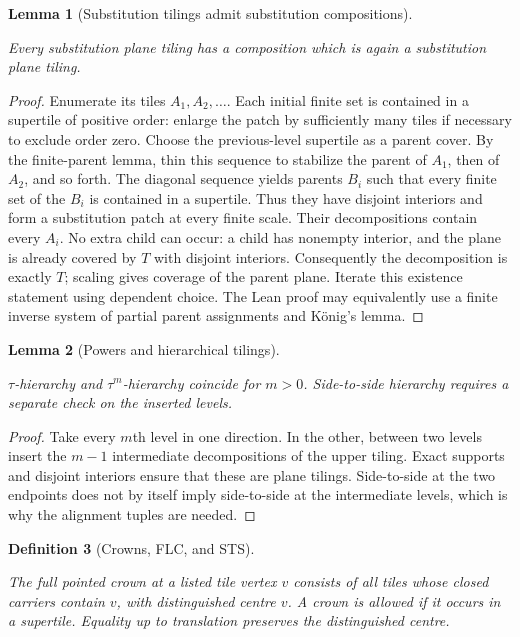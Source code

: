 \documentclass[11pt,a4paper]{article}
\newtheorem{definition}{Definition}[section]
\newtheorem{lemma}[definition]{Lemma}
\theoremstyle{remark}
\newcommand{\lean}[1]{}
\newcommand{\uses}[1]{}
\begin{document}
\begin{lemma}[Substitution tilings admit substitution compositions]
\label{lem:substitution-hierarchy}
\lean{Tilings.SubstitutionTiling.exists_composition}
\uses{def:hierarchy,lem:finiteparents,lem:localfinite}
Every substitution plane tiling has a composition which is again a
substitution plane tiling.
\end{lemma}
\begin{proof}
Enumerate its tiles $A_1,A_2,\ldots$. Each initial finite set is contained in
a supertile of positive order: enlarge the patch by sufficiently many
tiles if necessary to exclude order zero. Choose the previous-level
supertile as a parent cover. By the finite-parent lemma, thin this sequence
to stabilize the parent of $A_1$, then of $A_2$, and so forth. The diagonal
sequence yields parents $B_i$ such that every finite set of the $B_i$ is
contained in a supertile. Thus they have disjoint interiors and form a
substitution patch at every finite scale. Their decompositions contain
every $A_i$. No extra child can occur: a child has nonempty interior, and
the plane is already covered by $T$ with disjoint interiors. Consequently
the decomposition is exactly $T$; scaling gives coverage of the parent
plane. Iterate this existence statement using dependent choice.
The Lean proof may equivalently use a finite inverse system of partial
parent assignments and K\"onig's lemma.
\end{proof}

\begin{lemma}[Powers and hierarchical tilings]\label{lem:hierarchy-step}
\lean{Tilings.hierarchical_power_iff}
\uses{def:hierarchy}
$\tau$-hierarchy and $\tau^m$-hierarchy coincide for $m>0$.
Side-to-side hierarchy requires a separate check on the inserted levels.
\end{lemma}
\begin{proof}
Take every $m$th level in one direction. In the other, between two levels
insert the $m-1$ intermediate decompositions of the upper tiling. Exact
supports and disjoint interiors ensure that these are plane tilings.
Side-to-side at the two endpoints does not by itself imply side-to-side
at the intermediate levels, which is why the alignment tuples are needed.
\end{proof}

\begin{definition}[Crowns, FLC, and STS]\label{def:crown}
\lean{Tilings.Crown,Tilings.AllowedCrown}
\uses{def:placed,def:substitution,lem:localfinite}
The full pointed crown at a listed tile vertex $v$ consists of all tiles
whose closed carriers contain $v$, with distinguished centre $v$.
A crown is allowed if it occurs in a supertile. Equality up to translation
preserves the distinguished centre.
\end{definition}
\end{document}
